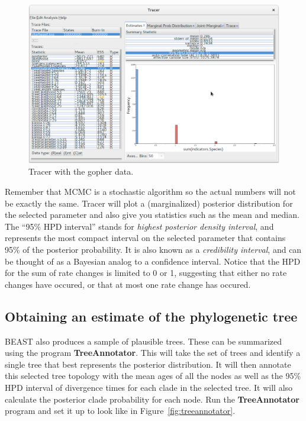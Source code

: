\documentclass{article}
\begin{document}
\begin{figure}[htb!]
\centering
\includegraphics[width=\textwidth]{figures/tracer-posterior.png}
\caption{Tracer with the gopher data.}
\label{fig:tracer}
\end{figure}

Remember that MCMC is a stochastic algorithm so the actual numbers will not be
exactly the same. Tracer will plot a (marginalized) posterior distribution for
the selected parameter and also give you statistics such as the mean and median.
The ``95\% HPD interval'' stands for \textit{highest posterior density
interval}, and represents the most compact interval on the selected parameter
that contains 95\% of the posterior probability. It is also known as a
\textit{credibility interval}, and can be thought of as a Bayesian analog to a
confidence interval. Notice that the HPD for the sum of rate changes is limited
to 0 or 1, suggesting that either no rate changes have occured, or that at most
one rate change has occured.

\subsection*{Obtaining an estimate of the phylogenetic tree}

BEAST also produces a sample of plausible trees. These can be summarized using
the program \textbf{TreeAnnotator}. This will take the set of trees and identify
a single tree that best represents the posterior distribution. It will then
annotate this selected tree topology with the mean ages of all the nodes as well
as the 95\% HPD interval of divergence times for each clade in the selected
tree. It will also calculate the posterior clade probability for each node. Run
the \textbf{TreeAnnotator} program and set it up to look like in
Figure~\ref{fig:treeannotator}.
\end{document}
